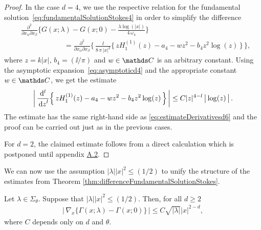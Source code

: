 \begin{proof}
In the case $d = 4$, we use the respective relation for the fundamental solution~\eqref{eq:fundamentalSolutionStokes4} in order to simplify the difference
\begin{align*}
  & \frac{\partial^2}{\partial x_\alpha \partial x_\beta} \bigg\{ G(x; \lambda) - G(x; 0) - \frac{\lambda \log(|x|)}{4\, \omega_4} \bigg\} \\
  &\qquad\qquad\qquad= \frac{\partial^2}{\partial x_\alpha \partial x_\beta} \bigg\{ \,\frac{\ii}{8\, \pi\, |x|^2} \Big\{ \,z H_1^{(1)}(z) - a_4 - w z^2 - b_4 z^2 \log(z)\,\Big\} \, \bigg\},
\end{align*}
where $z = k |x|$, $b_4 = ({\ii}/{\pi})$ and $w \in \C$ is an arbitrary constant. Using the asymptotic expansion~\eqref{eq:asymptoticd4} and the appropriate constant $w \in \C$, we get the estimate
\begin{align*}
  \bigg| \, \frac{\mathrm{d}^l}{\, {\operatorname{d}\!{z}}^l} \Big\{ \,z H_1^{(1)}(z) - a_4 - w z^2 - b_4 z^2 \log(z)\, \Big\} \, \bigg| \leq C |z|^{4 - l}\, \big|\log(z)\,\big|\,.
\end{align*}
The estimate has the same right-hand side as \eqref{eq:estimateDerivativesd6} and the proof can be carried out just as in the previous cases.

For $d = 2$, the claimed estimate follows from a direct calculation which is postponed until appendix \hyperref[sec:A2]{A.2}.
\end{proof}

We can now use the assumption $|\lambda||x|^2 \leq ({1}/{2})$  to unify the structure of the estimates from Theorem \ref{thm:differenceFundamentalSolutionStokes}.
\begin{cor}
  \label{cor:differenceFundamentalSolutionStokes}
  Let $\lambda \in \Sigma_\theta$. 
  Suppose that $|\lambda||x|^2 \leq ({1}/{2})$.
  Then, for all $d \geq 2$
  \begin{align*}
    \Big|\,\nabla_x\Big\{ \Gamma(x; \lambda) - \Gamma(x; 0)\Big\}\, \Big| \leq C \sqrt{|\lambda|} |x|^{2 - d},
  \end{align*}
  where $C$ depends only on $d$ and $\theta$.
\end{cor}

